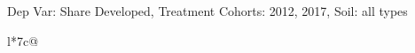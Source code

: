 \begin{table}[H]
\captionlistentry[table]{}
\label{table:beaver_land_class_DVis_land_class_3_SCg12_SSall_soil}
\scriptsize %
Dep Var: Share Developed, Treatment Cohorts: 2012, 2017, Soil: all types \\
\begin{threeparttable}
\begin{tabulary}{\textwidth}{l*{7}{c}@{}}
\toprule \toprule
\noalign{\smallskip}
\noalign{\smallskip}
\midrule \bottomrule
\end{tabulary}
\medskip
\end{threeparttable}
\end{table}
